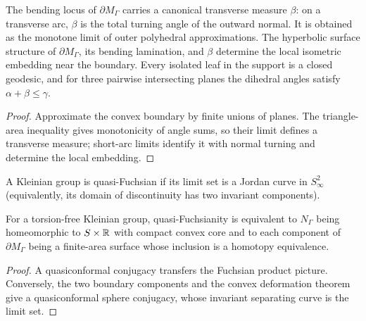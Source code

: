 \begin{proposition}
\label{thurston-ch08-bending-measure}
The bending locus of $\partial M_\Gamma$ carries a canonical transverse measure $\beta$: on a transverse arc, $\beta$ is the total turning angle of the outward normal.  It is obtained as the monotone limit of outer polyhedral approximations.  The hyperbolic surface structure of $\partial M_\Gamma$, its bending lamination, and $\beta$ determine the local isometric embedding near the boundary.  Every isolated leaf in the support is a closed geodesic, and for three pairwise intersecting planes the dihedral angles satisfy $\alpha+\beta\leq\gamma$.
\end{proposition}
\begin{proof}\sketch Approximate the convex boundary by finite unions of planes.  The triangle-area inequality gives monotonicity of angle sums, so their limit defines a transverse measure; short-arc limits identify it with normal turning and determine the local embedding.
\end{proof}

\begin{definition}
\label{thurston-ch08-quasi-fuchsian}
A Kleinian group is quasi-Fuchsian if its limit set is a Jordan curve in $S^2_\infty$ (equivalently, its domain of discontinuity has two invariant components).
\end{definition}

\begin{proposition}
\label{thurston-ch08-marden-criterion}
For a torsion-free Kleinian group, quasi-Fuchsianity is equivalent to $N_\Gamma$ being homeomorphic to $S\times\mathbb{R}$ with compact convex core and to each component of $\partial M_\Gamma$ being a finite-area surface whose inclusion is a homotopy equivalence.
\end{proposition}
\begin{proof}\sketch A quasiconformal conjugacy transfers the Fuchsian product picture.  Conversely, the two boundary components and the convex deformation theorem give a quasiconformal sphere conjugacy, whose invariant separating curve is the limit set.\end{proof}

